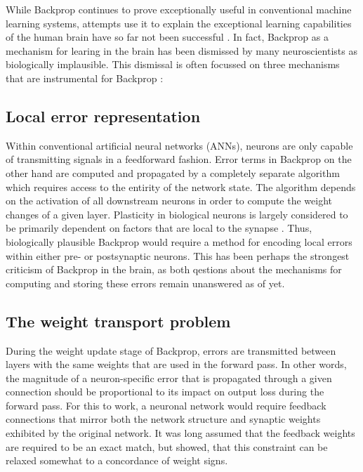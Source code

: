 While Backprop continues to prove exceptionally useful in conventional machine learning systems, attempts use it to
explain the exceptional learning capabilities of the human brain have so far not been successful \phrasing. In fact,
Backprop as a mechanism for learing in the brain has been dismissed by many neuroscientists as biologically
implausible\cite{Crick1989,Grossberg1987}. This dismissal is often focussed on three mechanisms that are instrumental
for Backprop \citep{whittington2019theories,Bengio2015}:



\subsection{Local error representation}

Within conventional artificial neural networks (ANNs), neurons are only capable of transmitting signals in a feedforward
fashion. Error terms in Backprop on the other hand are computed and propagated by a completely separate algorithm which
requires access to the entirity of the network state. The algorithm depends on the activation of all downstream neurons
in order to compute the weight changes of a given layer. Plasticity in biological neurons is largely considered to be
primarily dependent on factors that are local to the synapse \citep{Abbott2000,magee2020synaptic,urbanczik2014learning}
. Thus, biologically plausible Backprop would require a method for encoding local errors
within either pre- or postsynaptic neurons. This has been perhaps the strongest criticism of Backprop in the brain, as
both qestions about the mechanisms for computing and storing these errors remain unanswered as of yet.

\subsection{The weight transport problem}

During the weight update stage of Backprop, errors are transmitted between layers with the same weights that are used in
the forward pass. In other words, the magnitude of a neuron-specific error that is propagated through a given connection
should be proportional to its impact on output loss during the forward pass. For this to work, a neuronal network would
require feedback connections that mirror both the network structure and synaptic weights exhibited by the original
network. It was long assumed that the feedback weights are required to be an exact match, but \cite{Liao2016} showed,
that this constraint can be relaxed somewhat to a concordance of weight signs.

